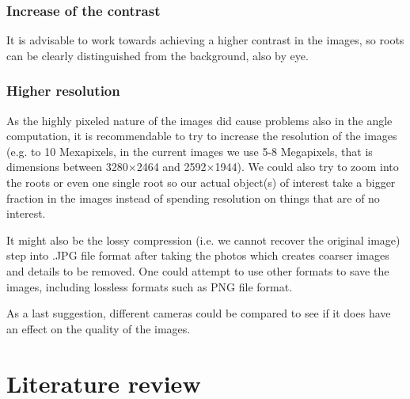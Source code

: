 \subsection{Increase of the contrast}

It is advisable to work towards achieving a higher contrast in the images, so roots can be clearly distinguished from the background, also by eye.




\subsection{Higher resolution}


As the highly pixeled nature of the images did cause problems also in the angle computation, it is recommendable to try to increase the resolution of the images (e.g. to 10 Mexapixels, in the current images we use 5-8 Megapixels, that is dimensions between 3280\(\times\)2464 and 2592\(\times\)1944). We could also try to zoom into the roots or even one single root so our actual object(s) of interest take a bigger fraction in the images instead of spending resolution on things that are of no interest. 

It might also be the lossy compression (i.e. we cannot recover the original image) step into .JPG file format after taking the photos which creates coarser images and details to be removed.
One could attempt to use other formats to save the images, including lossless formats such as PNG file format.

As a last suggestion, different cameras could be compared to see if it does have an effect on the quality of the images. 



\chapter{Literature review}\label{litreview}


